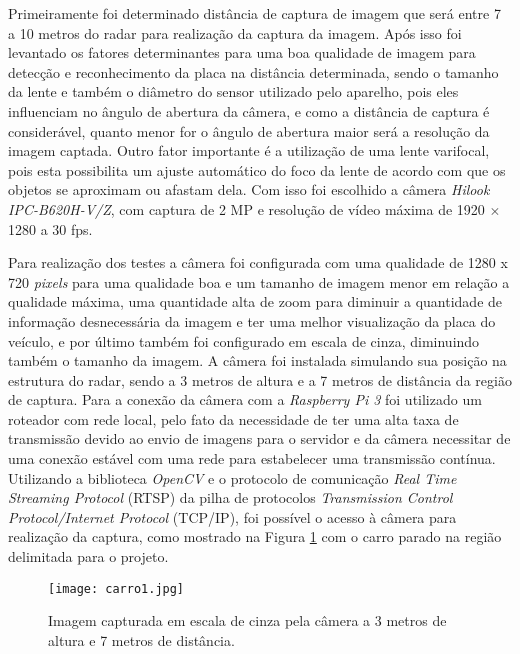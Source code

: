 Primeiramente foi determinado distância de captura de imagem que será entre 7 a 10 metros do radar para realização da captura da imagem. Após isso foi levantado os fatores determinantes para uma boa qualidade de imagem para detecção e reconhecimento da placa na distância determinada, sendo o tamanho da lente e também o diâmetro do sensor utilizado pelo aparelho, pois eles influenciam no ângulo de abertura da câmera, e como a distância de captura é considerável, quanto menor for o ângulo de abertura maior será a resolução da imagem captada. Outro fator importante é a utilização de uma lente varifocal, pois esta possibilita um ajuste automático do foco da lente de acordo com que os objetos se aproximam ou afastam dela. Com isso foi escolhido a câmera \emph{Hilook IPC-B620H-V/Z}, com captura de 2 MP e resolução de vídeo máxima de 1920 $\times$ 1280 a 30 fps. \par
Para realização dos testes a câmera foi configurada com uma qualidade de 1280 x 720 \emph{pixels} para uma qualidade boa e um tamanho de imagem menor em relação a qualidade máxima, uma quantidade alta de zoom para diminuir a quantidade de informação desnecessária da imagem e ter uma melhor visualização da placa do veículo, e por último também foi configurado em escala de cinza, diminuindo também o tamanho da imagem. A câmera foi instalada simulando sua posição na estrutura do radar, sendo a 3 metros de altura e a 7 metros de distância da região de captura. Para a conexão da câmera com a \emph{Raspberry Pi 3} foi utilizado um roteador com rede local, pelo fato da necessidade de ter uma alta taxa de transmissão devido ao envio de imagens para o servidor e da câmera necessitar de uma conexão estável com uma rede para estabelecer uma transmissão contínua. Utilizando a biblioteca \emph{OpenCV} e o protocolo de comunicação  \emph{Real Time Streaming Protocol} (RTSP) da pilha de protocolos \emph{Transmission Control Protocol/Internet Protocol} (TCP/IP), foi possível o acesso à câmera para realização da captura, como mostrado na Figura \ref{carro1} com o carro parado na região delimitada para o projeto.


\begin{figure}[H]
    \centering
    \texttt{[image: carro1.jpg]}
    \caption{Imagem capturada em escala de cinza pela câmera a 3 metros de altura e 7 metros de distância.}
    \label{carro1}
\end{figure}

